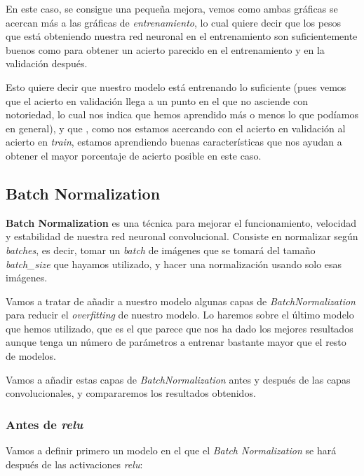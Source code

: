 \documentclass[11pt]{article}
\begin{document}
    En este caso, se consigue una pequeña mejora, vemos como ambas gráficas
se acercan más a las gráficas de \emph{entrenamiento}, lo cual quiere
decir que los pesos que está obteniendo nuestra red neuronal en el
entrenamiento son suficientemente buenos como para obtener un acierto
parecido en el entrenamiento y en la validación después.

Esto quiere decir que nuestro modelo está entrenando lo suficiente (pues
vemos que el acierto en validación llega a un punto en el que no
asciende con notoriedad, lo cual nos indica que hemos aprendido más o
menos lo que podíamos en general), y que , como nos estamos acercando
con el acierto en validación al acierto en \emph{train}, estamos
aprendiendo buenas características que nos ayudan a obtener el mayor
porcentaje de acierto posible en este caso.

\hypertarget{batch-normalization}{%
\subsection{Batch Normalization}\label{batch-normalization}}

\textbf{Batch Normalization} es una técnica para mejorar el
funcionamiento, velocidad y estabilidad de nuestra red neuronal
convolucional. Consiste en normalizar según \emph{batches}, es decir,
tomar un \emph{batch} de imágenes que se tomará del tamaño
\emph{batch\_size} que hayamos utilizado, y hacer una normalización
usando solo esas imágenes.

Vamos a tratar de añadir a nuestro modelo algunas capas de
\emph{BatchNormalization} para reducir el \emph{overfitting} de nuestro
modelo. Lo haremos sobre el último modelo que hemos utilizado, que es el que
parece que nos ha dado los mejores resultados aunque tenga un número de
parámetros a entrenar bastante mayor que el resto de modelos.

Vamos a añadir estas capas de \emph{BatchNormalization} antes y después
de las capas convolucionales, y compararemos los resultados obtenidos.

\hypertarget{antes-de-relu}{%
\subsubsection{\texorpdfstring{Antes de
\emph{relu}}{Antes de relu}}\label{antes-de-relu}}

Vamos a definir primero un modelo en el que el \emph{Batch
Normalization} se hará después de las activaciones \emph{relu}:
\end{document}

